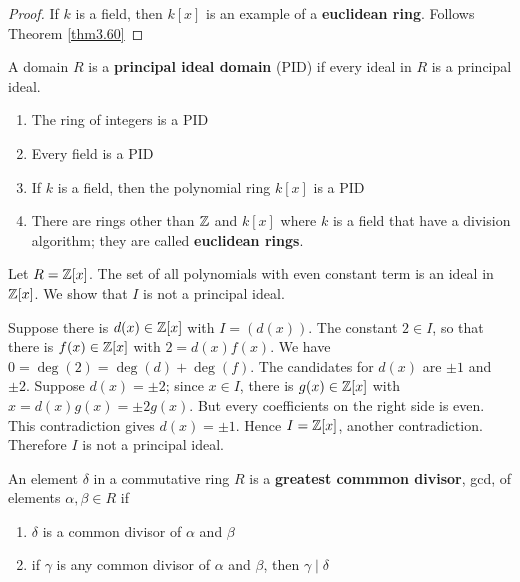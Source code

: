 \documentclass[11pt]{article}
\begin{document}
\begin{proof}
If \(k\) is a field, then \(k[x]\) is an example of a \textbf{euclidean ring}. Follows
Theorem \ref{thm3.60}
\end{proof}


\begin{definition}[]
A domain \(R\) is a \textbf{principal ideal domain} (PID) if every ideal in \(R\) is a principal
ideal. 
\end{definition}

\begin{examplle}[]
\begin{enumerate}
\item The ring of integers is a PID
\item Every field is a PID
\item If \(k\) is a field, then the polynomial ring \(k[x]\) is a PID
\item There are rings other than \(\mathbb{Z}\) and \(k[x]\) where \(k\) is a field that
have a division algorithm; they are called \textbf{euclidean rings}.
\end{enumerate}
\end{examplle}

\begin{examplle}[]
Let \(R=\mathbb{Z}[x]\). The set of all polynomials with even constant term is an
ideal in \(\mathbb{Z}[x]\). We show that \(I\) is not a principal ideal.

Suppose there is \(d(x)\in\mathbb{Z}[x]\) with \(I=(d(x))\). The constant \(2\in I\),
so that there is \(f(x)\in\mathbb{Z}[x]\) with \(2=d(x)f(x)\). We have
\(0=\deg(2)=\deg(d)+\deg(f)\). The candidates for \(d(x)\) are \(\pm1\) and
\(\pm2\). Suppose \(d(x)=\pm2\); since \(x\in I\), there is \(g(x)\in\mathbb{Z}[x]\) with
\(x=d(x)g(x)=\pm2g(x)\). But every coefficients on the right side is even.
This contradiction gives \(d(x)=\pm1\). Hence \(I=\mathbb{Z}[x]\), another
contradiction. Therefore \(I\) is not a principal ideal.
\end{examplle}

\begin{definition}[]
An element \(\delta\) in a commutative ring \(R\) is a \textbf{greatest commmon divisor}, gcd, of
elements \(\alpha,\beta \in R\) if
\begin{enumerate}
\item \(\delta\) is a common divisor of \(\alpha\) and \(\beta\)
\item if \(\gamma\) is any common divisor of \(\alpha\) and \(\beta\), then \(\gamma\mid\delta\)
\end{enumerate}
\end{definition}
\end{document}

